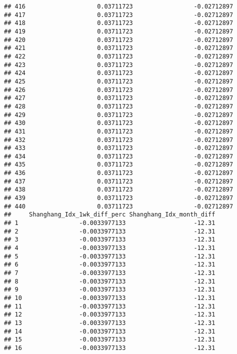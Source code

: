 \documentclass[]{article}
\begin{document}
\begin{verbatim}
## 416                    0.03711723                 -0.02712897
## 417                    0.03711723                 -0.02712897
## 418                    0.03711723                 -0.02712897
## 419                    0.03711723                 -0.02712897
## 420                    0.03711723                 -0.02712897
## 421                    0.03711723                 -0.02712897
## 422                    0.03711723                 -0.02712897
## 423                    0.03711723                 -0.02712897
## 424                    0.03711723                 -0.02712897
## 425                    0.03711723                 -0.02712897
## 426                    0.03711723                 -0.02712897
## 427                    0.03711723                 -0.02712897
## 428                    0.03711723                 -0.02712897
## 429                    0.03711723                 -0.02712897
## 430                    0.03711723                 -0.02712897
## 431                    0.03711723                 -0.02712897
## 432                    0.03711723                 -0.02712897
## 433                    0.03711723                 -0.02712897
## 434                    0.03711723                 -0.02712897
## 435                    0.03711723                 -0.02712897
## 436                    0.03711723                 -0.02712897
## 437                    0.03711723                 -0.02712897
## 438                    0.03711723                 -0.02712897
## 439                    0.03711723                 -0.02712897
## 440                    0.03711723                 -0.02712897
##     Shanghang_Idx_1wk_diff_perc Shanghang_Idx_month_diff
## 1                 -0.0033977133                   -12.31
## 2                 -0.0033977133                   -12.31
## 3                 -0.0033977133                   -12.31
## 4                 -0.0033977133                   -12.31
## 5                 -0.0033977133                   -12.31
## 6                 -0.0033977133                   -12.31
## 7                 -0.0033977133                   -12.31
## 8                 -0.0033977133                   -12.31
## 9                 -0.0033977133                   -12.31
## 10                -0.0033977133                   -12.31
## 11                -0.0033977133                   -12.31
## 12                -0.0033977133                   -12.31
## 13                -0.0033977133                   -12.31
## 14                -0.0033977133                   -12.31
## 15                -0.0033977133                   -12.31
## 16                -0.0033977133                   -12.31

\end{verbatim}
\end{document}
